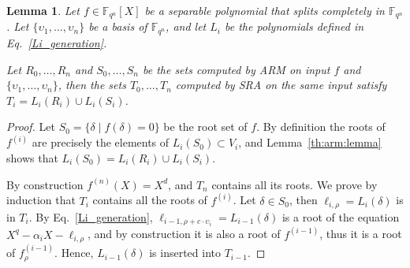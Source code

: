 \documentclass{article}
\newcommand{\ff}[1]{\mathbb{F}_{#1}}
\newcommand{\qq}{q}
\newcommand{\nn}{n}
\newcommand{\qn}{{\qq^\nn}}
\newcommand{\extf}{\ff{\qn}}
\newtheorem{Lem}{Lemma}
\begin{document}
\begin{Lem}
  \label{th:sra_eq_arm}
  Let $f\in\extf[X]$ be a separable polynomial that splits completely
  in $\extf$. Let $\{\upsilon_1,\dots,\upsilon_n\}$ be a basis of
  $\extf$, and let $L_i$ be the polynomials defined in
  Eq.~\eqref{Li_generation}.

  Let $R_0,\dots,R_n$ and $S_0,\dots,S_n$ be the sets computed by ARM
  on input $f$ and $\{\upsilon_1,\dots,\upsilon_n\}$, then the sets
  $T_0,\dots,T_n$ computed by SRA on the same input satisfy
  $T_i = L_i(R_i)\cup L_i(S_i)$.
\end{Lem}
\begin{proof}
  Let $S_0 = \{\delta\mid f(\delta)=0\}$ be the root set of $f$. %
  By definition the roots of $f^{(i)}$ are precisely the elements of
  $L_i(S_0)\subset V_i$, and Lemma~\ref{th:arm:lemma} shows that
  $L_i(S_0) = L_i(R_i)\cup L_i(S_i)$.

  By construction $f^{(n)}(X)=X^d$, and $T_n$ contains all its
  roots. %
  We prove by induction that $T_i$ contains all the roots of
  $f^{(i)}$. %
  Let $\delta\in S_0$, then $\ell_{i,\rho}=L_i(\delta)$ is in $T_i$. %
  By Eq.~\eqref{Li_generation}, $\ell_{i-1,\rho+c\cdot\upsilon_i}=L_{i-1}(\delta)$ is
  a root of the equation $X^q - \alpha_iX - \ell_{i,\rho}$, and by
  construction it is also a root of $f^{(i-1)}$, thus it is a root of
  $f_\rho^{(i-1)}$. %
  Hence, $L_{i-1}(\delta)$ is inserted into $T_{i-1}$.
\end{proof}
\end{document}
